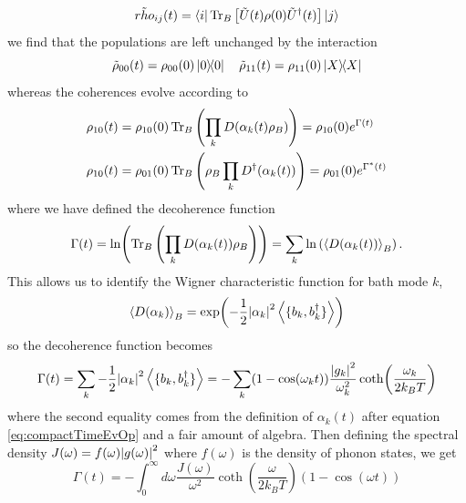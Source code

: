 \documentclass[]{article}
\begin{document}
\begin{itemize}
\begin{itemize}
\begin{equation}
\tilde{rho}_{ij}(t) = \bra{i}\Tr_B\left[\tilde{U}(t)\rho(0)\tilde{U}^{\dagger}(t)\right]\ket{j}
\end{equation}
we find that the populations are left unchanged by the interaction
\begin{equation}
\tilde{\rho}_{00}(t) =\rho_{00}(0)\dyad{0} \quad \tilde{\rho}_{11}(t) =\rho_{11}(0)\dyad{X}
\end{equation}
whereas the coherences evolve according to
\begin{align}
\rho_{10}(t) &= \rho_{10}(0)\Tr_B\left(\prod_k D(\alpha_k(t)\rho_B)\right) = \rho_{10}(0)e^{\Gamma(t)} \\
\rho_{10}(t) &= \rho_{01}(0)\Tr_B\left(\rho_B\prod_kD^{\dagger}(\alpha_k(t))\right) = \rho_{01}(0)e^{\Gamma^*(t)}
\end{align}
where we have defined the decoherence function
\begin{equation}
\Gamma(t)=\ln(\Tr_B\left(\prod_k D(\alpha_k(t))\rho_B\right))=\sum_k\ln\left(\expval{D(\alpha_k(t))}_B\right).
\end{equation}
This allows us to identify the Wigner characteristic function for bath mode $k$, 
\begin{equation}
\expval{D(\alpha_k)}_B = \exp(-\frac{1}{2}\abs{\alpha_k}^2\expval{\{b_k, b_k^{\dagger} \}})
\end{equation}
so the decoherence function becomes
\begin{equation}
\Gamma(t)=\sum_k -\frac{1}{2}\abs{\alpha_k}^2\expval{\{b_k, b_k^{\dagger} \}} = -\sum_k (1-\cos(\omega_k t))\frac{\abs{g_k}^2}{\omega_k^2} \coth(\frac{\omega_k}{2k_BT})
\end{equation}
where the second equality comes from the definition of $\alpha_k(t)$ after equation \ref{eq:compactTimeEvOp} and a fair amount of algebra. Then defining the spectral density $J(\omega)=f(\omega)\abs{g(\omega)}^2$ where $f(\omega)$ is the density of phonon states, we get
\begin{equation}
\Gamma(t) = -\int_{0}^{\infty}d\omega \frac{J(\omega)}{\omega^2} \coth(\frac{\omega}{2k_BT})(1-\cos(\omega t))
\end{equation}

\end{itemize}
\end{itemize}
\end{document}

